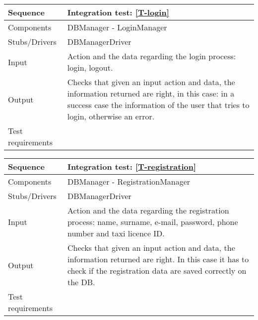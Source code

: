 

\begin{table}[H]
    \begin{tabularx}{\textwidth}{l|X}
        \hline
        Sequence
        & 
        Integration test: \ref{T-login}
        \\ \hline
        Components 
        & 
        DBManager - LoginManager
        \\ \hline
        Stubs/Drivers 
        & 
        DBManagerDriver
        \\ \hline
        Input 
        & 
        Action and the data regarding the login process: login, logout.
        \\ \hline
        Output 
        & 
        Checks that given an input action and data, the information returned are right, in this case: in a success case the information of the user that tries to login, otherwise an error.
        \\ \hline
        Test requirements 
        & 
        
        \\ \hline
    \end{tabularx}
\end{table}

\begin{table}[H]
    \begin{tabularx}{\textwidth}{l|X}
        \hline
        Sequence
        & 
        Integration test: \ref{T-registration}
        \\ \hline
        Components 
        & 
        DBManager - RegistrationManager
        \\ \hline
        Stubs/Drivers 
        & 
        DBManagerDriver
        \\ \hline
        Input 
        & 
        Action and the data regarding the registration process: name, surname, e-mail, password, phone number and taxi licence ID.
        \\ \hline
        Output 
        & 
        Checks that given an input action and data, the information returned are right. In this case it has to check if the registration data  are saved correctly on the DB.
          \\ \hline
        Test requirements 
        & 
        
        \\ \hline
    \end{tabularx}
\end{table}

